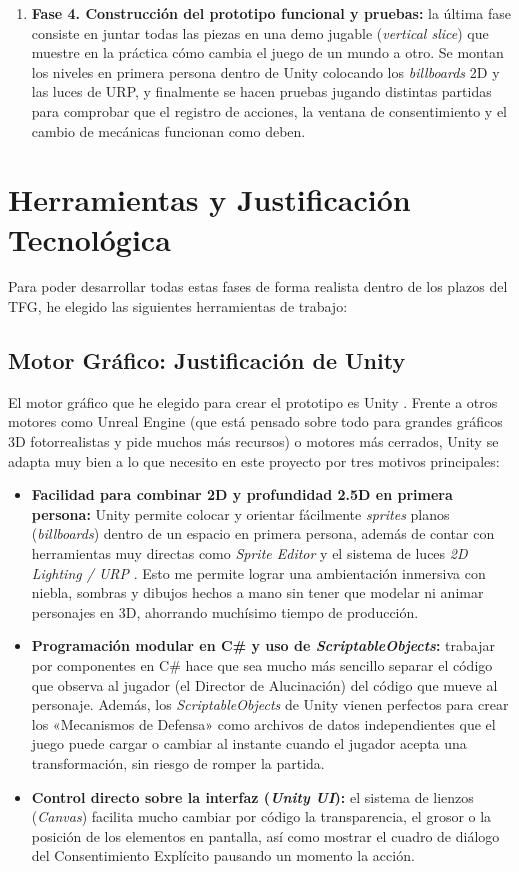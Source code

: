 \begin{enumerate}
  \item \textbf{Fase 4. Construcción del prototipo funcional y pruebas:} la última fase consiste en juntar todas las piezas en una demo jugable (\textit{vertical slice}) que muestre en la práctica cómo cambia el juego de un mundo a otro. Se montan los niveles en primera persona dentro de Unity colocando los \textit{billboards} \ac{2D} y las luces de \ac{URP}, y finalmente se hacen pruebas jugando distintas partidas para comprobar que el registro de acciones, la ventana de consentimiento y el cambio de mecánicas funcionan como deben.
\end{enumerate}

\section{Herramientas y Justificación Tecnológica}

Para poder desarrollar todas estas fases de forma realista dentro de los plazos del \ac{TFG}, he elegido las siguientes herramientas de trabajo:

\subsection{Motor Gráfico: Justificación de Unity}
El motor gráfico que he elegido para crear el prototipo es Unity \parencite{unity2023}. Frente a otros motores como Unreal Engine (que está pensado sobre todo para grandes gráficos 3D fotorrealistas y pide muchos más recursos) o motores más cerrados, Unity se adapta muy bien a lo que necesito en este proyecto por tres motivos principales:

\begin{itemize}
    \item \textbf{Facilidad para combinar \ac{2D} y profundidad 2.5D en primera persona:} Unity permite colocar y orientar fácilmente \textit{sprites} planos (\textit{billboards}) dentro de un espacio en primera persona, además de contar con herramientas muy directas como \textit{Sprite Editor} y el sistema de luces \textit{2D Lighting / URP} \parencite{unity2023}. Esto me permite lograr una ambientación inmersiva con niebla, sombras y dibujos hechos a mano sin tener que modelar ni animar personajes en 3D, ahorrando muchísimo tiempo de producción.
    \item \textbf{Programación modular en C\# y uso de \textit{ScriptableObjects}:} trabajar por componentes en C\# hace que sea mucho más sencillo separar el código que observa al jugador (el Director de Alucinación) del código que mueve al personaje. Además, los \textit{ScriptableObjects} de Unity vienen perfectos para crear los «Mecanismos de Defensa» como archivos de datos independientes que el juego puede cargar o cambiar al instante cuando el jugador acepta una transformación, sin riesgo de romper la partida.
    \item \textbf{Control directo sobre la interfaz (\textit{Unity UI}):} el sistema de lienzos (\textit{Canvas}) facilita mucho cambiar por código la transparencia, el grosor o la posición de los elementos en pantalla, así como mostrar el cuadro de diálogo del Consentimiento Explícito pausando un momento la acción.
\end{itemize}

